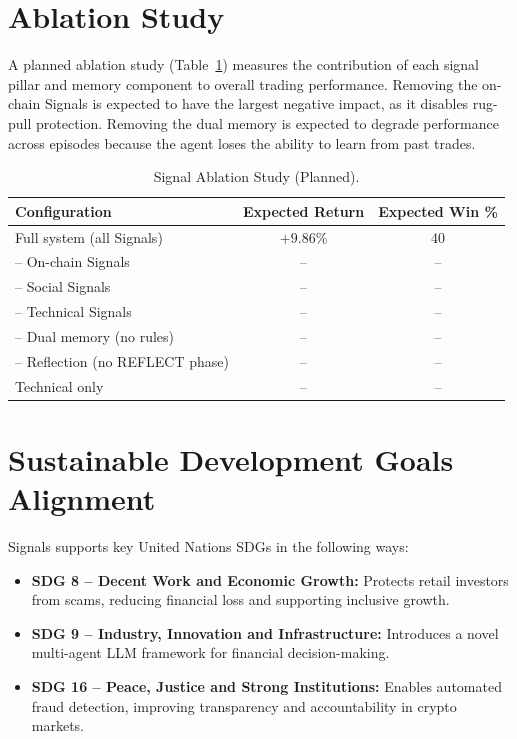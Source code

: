 \documentclass[12pt,a4paper,oneside,openany]{book}
\begin{document}
\begin{itemize}[leftmargin=8mm]
\section{Ablation Study}
A planned ablation study (Table~\ref{tab:ablation}) measures the contribution of each signal pillar and memory component to overall trading performance. Removing the on-chain Signals is expected to have the largest negative impact, as it disables rug-pull protection. Removing the dual memory is expected to degrade performance across episodes because the agent loses the ability to learn from past trades.

\begin{table}[H]
\centering
\caption{Signal Ablation Study (Planned).}
\label{tab:ablation}
\begin{tabular}{@{}lcc@{}}
\toprule
\textbf{Configuration}              & \textbf{Expected Return} & \textbf{Expected Win \%} \\
\midrule
Full system (all Signals)           & $+9.86\%$   & 40 \\
-- On-chain Signals                 & --          & -- \\
-- Social Signals                   & --          & -- \\
-- Technical Signals                & --          & -- \\
-- Dual memory (no rules)           & --          & -- \\
-- Reflection (no REFLECT phase)    & --          & -- \\
Technical only                      & --          & -- \\
\bottomrule
\end{tabular}
\end{table}
\section{Sustainable Development Goals Alignment}
Signals supports key United Nations SDGs in the following ways:

\begin{itemize}[leftmargin=8mm]
\item \textbf{SDG 8 -- Decent Work and Economic Growth:} Protects retail investors from scams, reducing financial loss and supporting inclusive growth.
\item \textbf{SDG 9 -- Industry, Innovation and Infrastructure:} Introduces a novel multi-agent LLM framework for financial decision-making.
\item \textbf{SDG 16 -- Peace, Justice and Strong Institutions:} Enables automated fraud detection, improving transparency and accountability in crypto markets.
\end{itemize}


\end{itemize}
\end{document}
